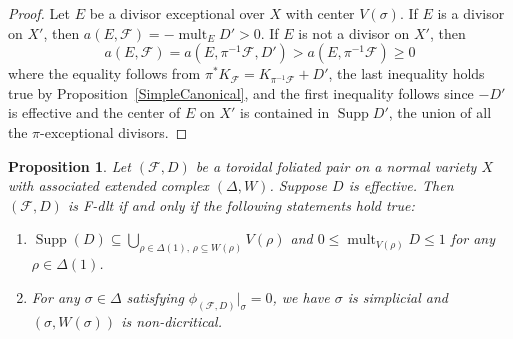 \documentclass[12pt,reqno]{amsart}
\newtheorem{proposition}[theorem]{Proposition}
\theoremstyle{definition}
\newcommand{\on}{\operatorname}
\newcommand\cF{{\mathcal{F}}}
\begin{document}
\begin{proof}
    Let $E$ be a divisor exceptional over $X$ with center $V(\sigma)$. 
    If $E$ is a divisor on $X'$, then $a(E,\cF)=-\on{mult}_E D'>0$. 
    If $E$ is not a divisor on $X'$, then 
    \[a(E,\cF)=a(E,\pi^{-1}\cF,D')> a(E,\pi^{-1}\cF)\geq 0\] 
    where the equality follows from $\pi^*K_{\cF} = K_{\pi^{-1}\cF}+D'$, the last inequality holds true by Proposition~\ref{SimpleCanonical}, and the first inequality follows since $-D'$ is effective and the center of $E$ on $X'$ is contained in $\on{Supp}D'$, the union of all the $\pi$-exceptional divisors. 
\end{proof}


\begin{proposition}\label{Fdlt_prop}
    Let $(\cF,D)$ be a toroidal foliated pair on a normal variety $X$ with associated extended complex $(\Delta,W)$. 
    Suppose $D$ is effective. 
    Then $(\cF,D)$ is F-dlt if and only if the following statements hold true:
    \begin{enumerate}
        \item $\on{Supp}(D)\subseteq\bigcup_{\rho\in\Delta(1),\,\rho\subseteq W(\rho)}V(\rho)$ and $0\leq\on{mult}_{V(\rho)}D\leq 1$ for any $\rho\in\Delta(1)$. 
        \item For any $\sigma\in\Delta$ satisfying $\phi_{(\cF,D)}\vert_\sigma=0$, we have $\sigma$ is simplicial and $(\sigma,W(\sigma))$ is non-dicritical. 
    \end{enumerate}
\end{proposition}
\end{document}
